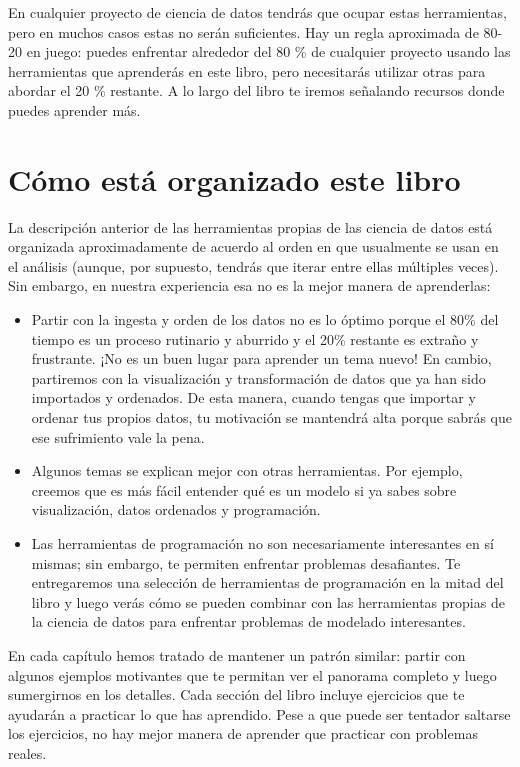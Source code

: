 \documentclass[11pt,oneside]{report}
\begin{document}
En cualquier proyecto de ciencia de datos tendrás que ocupar estas
herramientas, pero en muchos casos estas no serán suficientes. Hay un
regla aproximada de 80-20 en juego: puedes enfrentar alrededor del 80 \%
de cualquier proyecto usando las herramientas que aprenderás en este
libro, pero necesitarás utilizar otras para abordar el 20 \% restante. A
lo largo del libro te iremos señalando recursos donde puedes aprender
más.

\hypertarget{cuxf3mo-estuxe1-organizado-este-libro}{%
\section{Cómo está organizado este
libro}\label{cuxf3mo-estuxe1-organizado-este-libro}}

La descripción anterior de las herramientas propias de las ciencia de
datos está organizada aproximadamente de acuerdo al orden en que
usualmente se usan en el análisis (aunque, por supuesto, tendrás que
iterar entre ellas múltiples veces). Sin embargo, en nuestra experiencia
esa no es la mejor manera de aprenderlas:

\begin{itemize}
\item
  Partir con la ingesta y orden de los datos no es lo óptimo porque el
  80\% del tiempo es un proceso rutinario y aburrido y el 20\% restante
  es extraño y frustrante. ¡No es un buen lugar para aprender un tema
  nuevo! En cambio, partiremos con la visualización y transformación de
  datos que ya han sido importados y ordenados. De esta manera, cuando
  tengas que importar y ordenar tus propios datos, tu motivación se
  mantendrá alta porque sabrás que ese sufrimiento vale la pena.
\item
  Algunos temas se explican mejor con otras herramientas. Por ejemplo,
  creemos que es más fácil entender qué es un modelo si ya sabes sobre
  visualización, datos ordenados y programación.
\item
  Las herramientas de programación no son necesariamente interesantes en
  sí mismas; sin embargo, te permiten enfrentar problemas desafiantes.
  Te entregaremos una selección de herramientas de programación en la
  mitad del libro y luego verás cómo se pueden combinar con las
  herramientas propias de la ciencia de datos para enfrentar problemas
  de modelado interesantes.
\end{itemize}

En cada capítulo hemos tratado de mantener un patrón similar: partir con
algunos ejemplos motivantes que te permitan ver el panorama completo y
luego sumergirnos en los detalles. Cada sección del libro incluye
ejercicios que te ayudarán a practicar lo que has aprendido. Pese a que
puede ser tentador saltarse los ejercicios, no hay mejor manera de
aprender que practicar con problemas reales.
\end{document}
